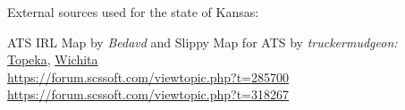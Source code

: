 %
%
%
%
%
%
%
%
%
%
%
%




\vspace{2em}\footnoterule
{\footnotesize \noindent External sources used for the state of Kansas:
\begin{description}[
style=nextline,
leftmargin=1.1em,
labelsep=0pt,
parsep=0pt,
font=\normalfont,
]

\item[$\ast$]
ATS IRL Map by \textit{Bedavd} and Slippy Map for ATS by \textit{truckermudgeon:}\\
\hyperref[city:Topeka]{Topeka},
\hyperref[city:Wichita]{Wichita}
\\ \url{https://forum.scssoft.com/viewtopic.php?t=285700}
\\ \url{https://forum.scssoft.com/viewtopic.php?t=318267}

\end{description}
}

